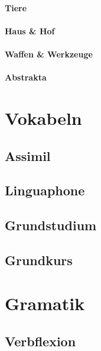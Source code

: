\documentclass[justified, a4paper, notitlepage, captions=tableheading, nobib]{tufte-handout}
\begin{document}
\paragraph{Tiere}
\label{sec:org1fef551}

\paragraph{Haus \& Hof}
\label{sec:orgf3493de}

\paragraph{Waffen \& Werkzeuge}
\label{sec:org11f39fa}

\paragraph{Abstrakta}
\label{sec:org3f17b08}

\newpage
\section{Vokabeln }
\label{sec:org9c94e2f}

\subsection{Assimil}
\label{sec:org06f8da4}

\subsection{Linguaphone}
\label{sec:org846cf62}

\subsection{Grundstudium}
\label{sec:orgeeffff9}

\subsection{Grundkurs}
\label{sec:orgb7819ba}

\newpage
\section{Gramatik }
\label{sec:orgf278b0e}

\subsection{Verbflexion }
\label{sec:orgb6acec4}
\end{document}
